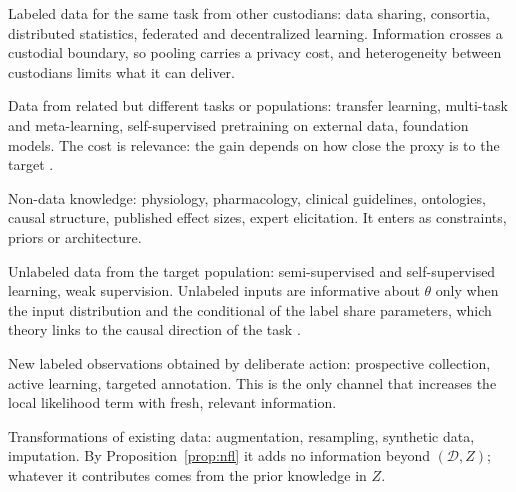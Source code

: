\documentclass[acmsmall,screen,review]{acmart}
\theoremstyle{acmdefinition}
\begin{document}
\begin{description}[leftmargin=0pt,topsep=3pt,itemsep=3pt,parsep=0pt]
\item[P1 Pooling.] Labeled data for the same task from other custodians: data sharing, consortia, distributed statistics, federated and decentralized learning. Information crosses a custodial boundary, so pooling carries a privacy cost, and heterogeneity between custodians limits what it can deliver.
\item[P2 Proxy.] Data from related but different tasks or populations: transfer learning, multi-task and meta-learning, self-supervised pretraining on external data, foundation models. The cost is relevance: the gain depends on how close the proxy is to the target \cite{bendavid2010theory,tripuraneni2020theory}.
\item[P3 Prior.] Non-data knowledge: physiology, pharmacology, clinical guidelines, ontologies, causal structure, published effect sizes, expert elicitation. It enters as constraints, priors or architecture.
\item[P4 Unlabeled.] Unlabeled data from the target population: semi-supervised and self-supervised learning, weak supervision. Unlabeled inputs are informative about $\theta$ only when the input distribution and the conditional of the label share parameters, which theory links to the causal direction of the task \cite{scholkopf2012causal}.
\item[P5 Procurement.] New labeled observations obtained by deliberate action: prospective collection, active learning, targeted annotation. This is the only channel that increases the local likelihood term with fresh, relevant information.
\item[P6 Re-expression.] Transformations of existing data: augmentation, resampling, synthetic data, imputation. By Proposition~\ref{prop:nfl} it adds no information beyond $(\mathcal{D},Z)$; whatever it contributes comes from the prior knowledge in $Z$.
\end{description}
\end{document}
